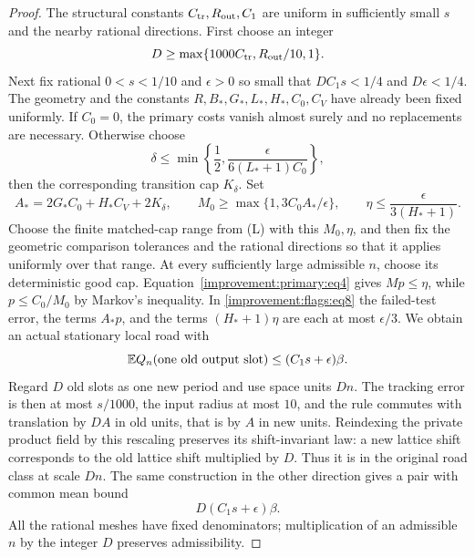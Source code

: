 \begin{proof}
The structural constants $C_{\rm tr},R_{\rm out},C_1$ are uniform
in sufficiently small $s$ and the nearby rational directions.
First choose an integer
\begin{equation}
 D\geq\max\{1000C_{\rm tr},R_{\rm out}/10,1\}.
 \label{improvement:contraction:eq2}
\end{equation}
Next fix rational $0<s<1/10$ and $\epsilon>0$ so small that
$DC_1s<1/4$ and $D\epsilon<1/4$. The geometry and the constants
$R,B_*,G_*,L_*,H_*,C_0,C_V$ have already been fixed uniformly.
If $C_0=0$, the primary costs vanish almost surely and no replacements
are necessary. Otherwise choose
\[
 \delta\leq\min\left\{\frac12,
       \frac{\epsilon}{6(L_*+1)C_0}\right\},
\]
then the corresponding transition cap $K_\delta$. Set
\[
 A_*=2G_*C_0+H_*C_V+2K_\delta,
 \qquad
 M_0\geq\max\{1,3C_0A_*/\epsilon\},
 \qquad \eta\leq\frac{\epsilon}{3(H_*+1)}.
\]
Choose the finite matched-cap range from (L) with this $M_0,\eta$,
and then fix the geometric comparison tolerances and the rational
directions so that it applies uniformly over that range. At every
sufficiently large admissible $n$, choose its deterministic good cap.
Equation~\eqref{improvement:primary:eq4} gives $Mp\leq\eta$, while
$p\leq C_0/M_0$ by Markov's inequality. In
\eqref{improvement:flags:eq8} the failed-test error, the terms
$A_*p$, and the terms $(H_*+1)\eta$ are each at most
$\epsilon/3$. We obtain an actual stationary local road with
\begin{equation}
 \mathbb E Q_n(\hbox{one old output slot})
       \leq(C_1s+\epsilon)\beta.
 \label{improvement:contraction:eq1}
\end{equation}
Regard $D$ old slots as one new period and use space units $Dn$.
The tracking error is then at most $s/1000$, the input radius at most
$10$, and the rule commutes with translation by $DA$ in old units,
that is by $A$ in new units. Reindexing the private product field by
this rescaling preserves its shift-invariant law: a new lattice shift
corresponds to the old lattice shift multiplied by $D$. Thus it is in the original road class at
scale $Dn$. The same construction in the other direction gives a pair
with common mean bound
\begin{equation}
 D(C_1s+\epsilon)\beta.
 \label{improvement:contraction:eq3}
\end{equation}
All the rational meshes have fixed denominators; multiplication of
an admissible $n$ by the integer $D$ preserves admissibility.


\end{proof}
